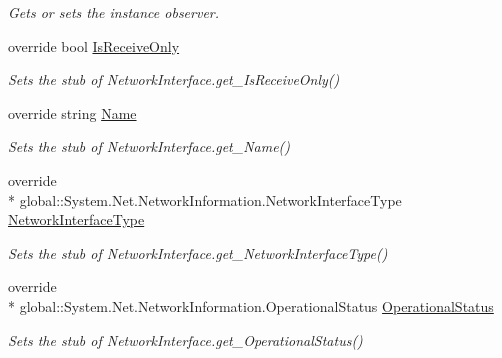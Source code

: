 \begin{DoxyCompactItemize}
\begin{DoxyCompactList}\small\item\em Gets or sets the instance observer.\end{DoxyCompactList}\item 
override bool \hyperlink{class_system_1_1_net_1_1_network_information_1_1_fakes_1_1_stub_network_interface_a8923b2f8c29ad2b259feb67734b42c0a}{Is\-Receive\-Only}
\begin{DoxyCompactList}\small\item\em Sets the stub of Network\-Interface.\-get\-\_\-\-Is\-Receive\-Only()\end{DoxyCompactList}\item 
override string \hyperlink{class_system_1_1_net_1_1_network_information_1_1_fakes_1_1_stub_network_interface_af9e526c76d0e512ee8a884203292f4c7}{Name}
\begin{DoxyCompactList}\small\item\em Sets the stub of Network\-Interface.\-get\-\_\-\-Name()\end{DoxyCompactList}\item 
override \\*
global\-::\-System.\-Net.\-Network\-Information.\-Network\-Interface\-Type \hyperlink{class_system_1_1_net_1_1_network_information_1_1_fakes_1_1_stub_network_interface_a33dc15b59688aec83c2b9c917b22c788}{Network\-Interface\-Type}
\begin{DoxyCompactList}\small\item\em Sets the stub of Network\-Interface.\-get\-\_\-\-Network\-Interface\-Type()\end{DoxyCompactList}\item 
override \\*
global\-::\-System.\-Net.\-Network\-Information.\-Operational\-Status \hyperlink{class_system_1_1_net_1_1_network_information_1_1_fakes_1_1_stub_network_interface_a589418adcf060da99be2156127e303a2}{Operational\-Status}
\begin{DoxyCompactList}\small\item\em Sets the stub of Network\-Interface.\-get\-\_\-\-Operational\-Status()\end{DoxyCompactList}\item 

\end{DoxyCompactItemize}
